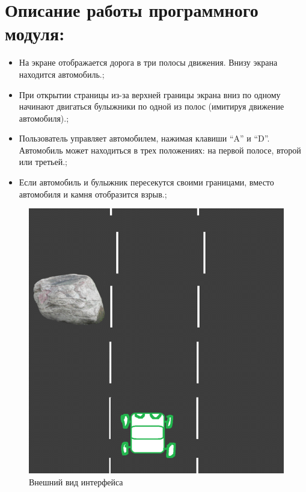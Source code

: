 \section{Описание работы программного модуля: }
\begin{itemize}
    \item На экране отображается дорога в три полосы движения.  Внизу экрана находится автомобиль.;
    \item При открытии страницы из-за верхней границы экрана вниз по одному начинают двигаться булыжники по одной из полос (имитируя движение автомобиля).;
    \item Пользователь управляет автомобилем, нажимая клавиши “A” и “D”. Автомобиль  может  находиться в трех положениях: на первой полосе, второй или третьей.; 
    \item Если автомобиль и булыжник пересекутся своими границами, вместо автомобиля и камня отобразится взрыв.;
\end{itemize}
    \begin{figure}[H]
	\begin{center}
		\includegraphics[scale=1]{fig/image.png}
		\caption{Внешний вид интерфейса}
		\label{pic:fig/image.png} %
	\end{center}
    \end{figure}
     
